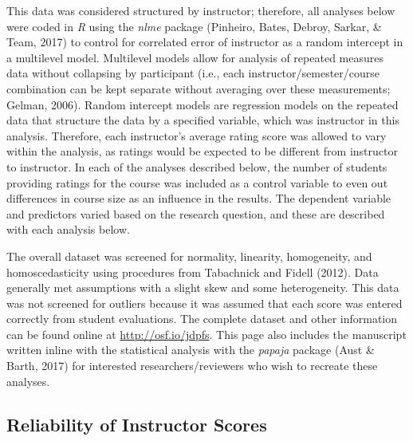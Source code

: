 \documentclass[,man,mask]{apa6}
\begin{document}
This data was considered structured by instructor; therefore, all analyses below were coded in \emph{R} using the \emph{nlme} package (Pinheiro, Bates, Debroy, Sarkar, \& Team, 2017) to control for correlated error of instructor as a random intercept in a multilevel model. Multilevel models allow for analysis of repeated measures data without collapsing by participant (i.e., each instructor/semester/course combination can be kept separate without averaging over these measurements; Gelman, 2006). Random intercept models are regression models on the repeated data that structure the data by a specified variable, which was instructor in this analysis. Therefore, each instructor's average rating score was allowed to vary within the analysis, as ratings would be expected to be different from instructor to instructor. In each of the analyses described below, the number of students providing ratings for the course was included as a control variable to even out differences in course size as an influence in the results. The dependent variable and predictors varied based on the research question, and these are described with each analysis below.

The overall dataset was screened for normality, linearity, homogeneity, and homoscedasticity using procedures from Tabachnick and Fidell (2012). Data generally met assumptions with a slight skew and some heterogeneity. This data was not screened for outliers because it was assumed that each score was entered correctly from student evaluations. The complete dataset and other information can be found online at \url{http://osf.io/jdpfs}. This page also includes the manuscript written inline with the statistical analysis with the \emph{papaja} package (Aust \& Barth, 2017) for interested researchers/reviewers who wish to recreate these analyses.

\hypertarget{reliability-of-instructor-scores}{%
\subsection{Reliability of Instructor Scores}\label{reliability-of-instructor-scores}}
\end{document}
